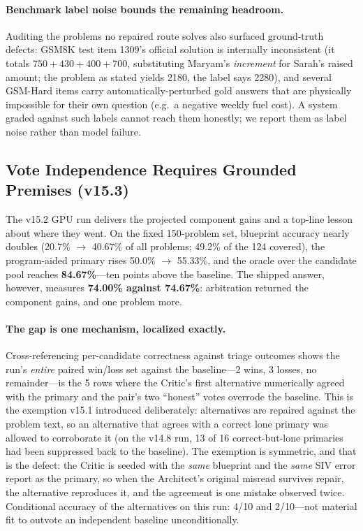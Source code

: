 \documentclass[11pt,a4paper]{article}
\begin{document}
\paragraph{Benchmark label noise bounds the remaining headroom.}
Auditing the problems no repaired route solves also surfaced ground-truth defects: GSM8K test item 1309's official solution is internally inconsistent (it totals $750+430+400+700$, substituting Maryam's \emph{increment} for Sarah's raised amount; the problem as stated yields 2180, the label says 2280), and several GSM-Hard items carry automatically-perturbed gold answers that are physically impossible for their own question (e.g.\ a negative weekly fuel cost).
A system graded against such labels cannot reach them honestly; we report them as label noise rather than model failure.

\subsection{Vote Independence Requires Grounded Premises (v15.3)}
\label{sec:v153_grounded_votes}
The v15.2 GPU run delivers the projected component gains and a top-line lesson about where they went.
On the fixed 150-problem set, blueprint accuracy nearly doubles (20.7\% $\to$ 40.67\% of all problems; 49.2\% of the 124 covered), the program-aided primary rises 50.0\% $\to$ 55.33\%, and the oracle over the candidate pool reaches \textbf{84.67\%}---ten points above the baseline.
The shipped answer, however, measures \textbf{74.00\% against 74.67\%}: arbitration returned the component gains, and one problem more.

\paragraph{The gap is one mechanism, localized exactly.}
Cross-referencing per-candidate correctness against triage outcomes shows the run's \emph{entire} paired win/loss set against the baseline---2 wins, 3 losses, no remainder---is the 5 rows where the Critic's first alternative numerically agreed with the primary and the pair's two ``honest'' votes overrode the baseline.
This is the exemption v15.1 introduced deliberately: alternatives are repaired against the problem text, so an alternative that agrees with a correct lone primary was allowed to corroborate it (on the v14.8 run, 13 of 16 correct-but-lone primaries had been suppressed back to the baseline).
The exemption is symmetric, and that is the defect: the Critic is seeded with the \emph{same} blueprint and the \emph{same} SIV error report as the primary, so when the Architect's original misread survives repair, the alternative reproduces it, and the agreement is one mistake observed twice.
Conditional accuracy of the alternatives on this run: 4/10 and 2/10---not material fit to outvote an independent baseline unconditionally.
\end{document}
